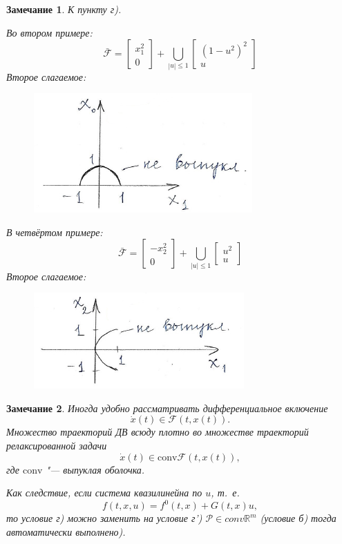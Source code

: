 \documentclass[12pt, a4paper]{article}
\theoremstyle{rusdef}
\newtheorem{remark}{Замечание}
\newcommand{\R}{\ensuremath{\mathbb{R}}} %
\renewcommand{\P}{\mathscr{P}} %
\begin{document}
\begin{remark}
  К пункту г). 
  
  Во втором примере:
  \[
    \bar{\mathcal{F}} = \begin{bmatrix}x_1^2\\0\end{bmatrix} + \bigcup\limits_{|u| \leqslant 1} \begin{bmatrix}(1-u^2)^2\\u\end{bmatrix}
  \]
  Второе слагаемое:
  \begin{figure}[ht!]
    \centering
    \includegraphics{pic4.png}
  \end{figure}

  В четвёртом примере:
  \[
    \bar{\mathcal{F}} = \begin{bmatrix}-x_2^2\\0\end{bmatrix} + \bigcup\limits_{|u| \leqslant 1} \begin{bmatrix}u^2\\u\end{bmatrix}
  \]
  Второе слагаемое:
  \begin{figure}[ht!]
    \centering
    \includegraphics{pic5.png}
  \end{figure}
\end{remark}
\begin{remark}
  Иногда удобно рассматривать дифференциальное включение
  \[
    \dot{x}(t) \in \mathcal{F}(t, x(t)).
  \]
  Множество траекторий ДВ всюду плотно во множестве траекторий релаксированной задачи
  \[
    \dot{x}(t) \in \mathrm{conv} \mathcal{F}(t, x(t)),
  \]
  где $\mathrm{conv}$ "--- выпуклая оболочка.

  Как следствие, если система квазилинейна по $u$, т.~е. 
  \[
    f(t,x,u) = f^0(t,x) + G(t,x)u,
  \]
  то условие г) можно заменить на условие г') $\P \in conv \R^m$ (условие б) тогда автоматически выполнено).
\end{remark}
\end{document}
